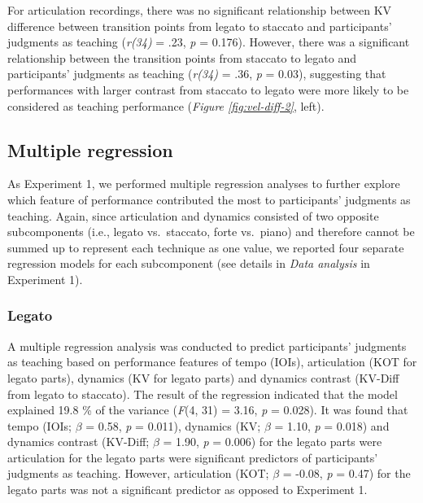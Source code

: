 \documentclass[
  man,floatsintext]{apa6}
\begin{document}
For articulation recordings, there was no significant relationship between KV difference between transition points from legato to staccato and participants' judgments as teaching (\emph{r(34)} = .23, \emph{p} = 0.176). However, there was a significant relationship between the transition points from staccato to legato and participants' judgments as teaching (\emph{r(34)} = .36, \emph{p} = 0.03), suggesting that performances with larger contrast from staccato to legato were more likely to be considered as teaching performance (\emph{Figure \ref{fig:vel-diff-2}}, left).

\hypertarget{multiple-regression-1}{%
\subsection{Multiple regression}\label{multiple-regression-1}}

As Experiment 1, we performed multiple regression analyses to further explore which feature of performance contributed the most to participants' judgments as teaching. Again, since articulation and dynamics consisted of two opposite subcomponents (i.e., legato vs.~staccato, forte vs.~piano) and therefore cannot be summed up to represent each technique as one value, we reported four separate regression models for each subcomponent (see details in \emph{Data analysis} in Experiment 1).

\hypertarget{legato-1}{%
\subsubsection{Legato}\label{legato-1}}

A multiple regression analysis was conducted to predict participants' judgments as teaching based on performance features of tempo (IOIs), articulation (KOT for legato parts), dynamics (KV for legato parts) and dynamics contrast (KV-Diff from legato to staccato). The result of the regression indicated that the model explained 19.8 \% of the variance (\emph{F}(4, 31) = 3.16, \emph{p} = 0.028). It was found that tempo (IOIs; \emph{\(\beta\)} = 0.58, \emph{p} = 0.011), dynamics (KV; \emph{\(\beta\)} = 1.10, \emph{p} = 0.018) and dynamics contrast (KV-Diff; \emph{\(\beta\)} = 1.90, \emph{p} = 0.006) for the legato parts were articulation for the legato parts were significant predictors of participants' judgments as teaching. However, articulation (KOT; \emph{\(\beta\)} = -0.08, \emph{p} = 0.47) for the legato parts was not a significant predictor as opposed to Experiment 1.
\end{document}
